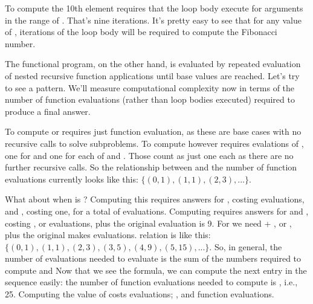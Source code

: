 \documentclass[letterpaper,10pt,english]{sphinxmanual}
\begin{document}
To compute the 10th element requires that the loop body execute for
arguments in the range of \sphinxstyleemphasis{{[}2, 3, …, 10{]}}. That’s nine iterations.
It’s pretty easy to see that for any value of ,  iterations of
the loop body will be required to compute the  Fibonacci number.

The functional program, on the other hand, is evaluated by repeated
evaluation of nested recursive function applications until base values
are reached.  Let’s try to see a pattern. We’ll measure computational
complexity now in terms of the number of function evaluations (rather
than loop bodies executed) required to produce a final answer.

To compute  or  requires just  function evaluation,
as these are base cases with no recursive calls to solve subproblems.
To compute  however requires  evalations of , one for
 and one for each of  and . Those count as just one each as
there are no further recursive calls. So the relationship between 
and the number of function evaluations currently looks like this:
\(\{ (0,1), (1,1), (2,3), ... \}.\)

What about when  is ?  Computing this requires answers for
, costing  evaluations, and , costing one, for a
total of  evaluations. Computing  requires answers for
 and , costing , or  evaluations, plus the
original evaluation is 9. For  we need  + , or ,
plus the original makes  evaluations.  relation is like this:
\(\{ (0,1), (1,1), (2,3), (3,5), (4,9), (5, 15), ... \}.\) So, in
general, the number of evaluations needed to evaluate  is
the sum of the numbers required to compute  and  Now that we see the formula, we can compute the next entry in the
sequence easily: the number of function evaluations needed to compute
 is , i.e., 25. Computing the value of 
costs  evaluations; , 
and  function evaluations.
\end{document}
